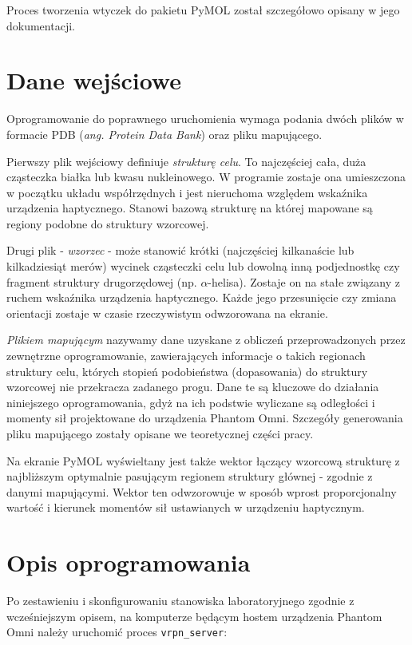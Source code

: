 \documentclass[licencjacka]{pracamgr}
\begin{document}
Proces tworzenia wtyczek do pakietu PyMOL został szczegółowo opisany w jego dokumentacji. 

\section{Dane wejściowe}
Oprogramowanie do poprawnego uruchomienia wymaga podania dwóch plików w formacie PDB (\textit{ang. Protein Data Bank}) oraz pliku mapującego. 

Pierwszy plik wejściowy definiuje \textit{strukturę celu}. To najczęściej cała, duża cząsteczka białka lub kwasu nukleinowego. W programie zostaje ona umieszczona w początku układu współrzędnych i jest nieruchoma względem wskaźnika urządzenia haptycznego. Stanowi bazową strukturę na której mapowane są regiony podobne do struktury wzorcowej.

Drugi plik - \textit{wzorzec} - może stanowić krótki (najczęściej kilkanaście lub kilkadziesiąt merów) wycinek cząsteczki celu lub dowolną inną podjednostkę czy fragment struktury drugorzędowej (np. $\alpha$-helisa). Zostaje on na stałe związany z ruchem wskaźnika urządzenia haptycznego. Każde jego przesunięcie czy zmiana orientacji zostaje w czasie rzeczywistym odwzorowana na ekranie. 

\textit{Plikiem mapującym} nazywamy dane uzyskane z obliczeń przeprowadzonych przez zewnętrzne oprogramowanie, zawierających informacje o takich regionach struktury celu, których stopień podobieństwa (dopasowania) do struktury wzorcowej nie przekracza zadanego progu. Dane te są kluczowe do działania niniejszego oprogramowania, gdyż na ich podstwie wyliczane są odległości i momenty sił projektowane do urządzenia Phantom Omni. Szczegóły generowania pliku mapującego zostały opisane we teoretycznej części pracy. 

Na ekranie PyMOL wyświeltany jest także wektor łączący wzorcową strukturę z najbliższym optymalnie pasującym regionem struktury głównej - zgodnie z danymi mapującymi. Wektor ten odwzorowuje w sposób wprost proporcjonalny wartość i kierunek momentów sił ustawianych w urządzeniu haptycznym.

\section{Opis oprogramowania}
Po zestawieniu i skonfigurowaniu stanowiska laboratoryjnego zgodnie z wcześniejszym opisem, na komputerze będącym hostem urządzenia Phantom Omni należy uruchomić proces \texttt{vrpn\_server}:
\end{document}
